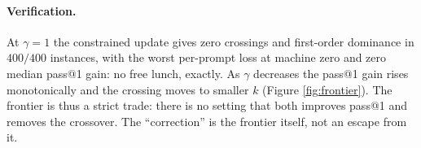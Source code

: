 \paragraph{Verification.}
At $\gamma=1$ the constrained update gives zero crossings and first-order
dominance in $400/400$ instances, with the worst per-prompt loss at machine zero
and zero median pass@1 gain: no free lunch, exactly. As $\gamma$ decreases the
pass@1 gain rises monotonically and the crossing moves to smaller $k$ (Figure
\ref{fig:frontier}). The frontier is thus a strict trade: there is no setting
that both improves pass@1 and removes the crossover. The ``correction'' is the
frontier itself, not an escape from it.